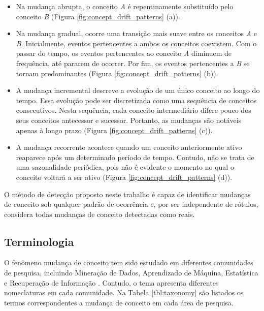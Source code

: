 \documentclass[msc, classic, a4paper]{ufbathesis}
\begin{document}
\begin{itemize}
    \item Na mudança abrupta, o conceito \textit{A} é repentinamente substituído pelo conceito \textit{B} (Figura \ref{fig:concept_drift_patterns} (a)).
    
    \item Na mudança gradual, ocorre uma transição mais suave entre os conceitos \textit{A} e \textit{B}. Inicialmente, eventos pertencentes a ambos os conceitos coexistem. Com o passar do tempo, os eventos pertencentes ao conceito \textit{A} diminuem de frequência, até pararem de ocorrer. Por fim, os eventos pertencentes a \textit{B} se tornam predominantes (Figura \ref{fig:concept_drift_patterns} (b)).
    
    \item A mudança incremental descreve a evolução de um único conceito ao longo do tempo. Essa evolução pode ser discretizada como uma sequência de conceitos consecutivos. Nesta sequência, cada conceito intermediário difere pouco dos seus conceitos antecessor e sucessor. Portanto, as mudanças são notáveis apenas à longo prazo (Figura \ref{fig:concept_drift_patterns} (c)).
    
    \item A mudança recorrente acontece quando um conceito anteriormente ativo reaparece após um determinado período de tempo. Contudo, não se trata de uma sazonalidade periódica, pois não é evidente o momento no qual o conceito voltará a ser ativo (Figura \ref{fig:concept_drift_patterns} (d)).
\end{itemize}

O método de detecção proposto neste trabalho é capaz de identificar mudanças de conceito sob qualquer padrão de ocorrência e, por ser independente de rótulos, considera todas mudanças de conceito detectadas como reais.


\subsection{Terminologia}

O fenômeno mudança de conceito tem sido estudado em diferentes comunidades de pesquisa, incluindo Mineração de Dados,
Aprendizado de Máquina, Estatística e Recuperação de Informação \cite{Zliobaite:2010}.
Contudo, o tema apresenta diferentes nomeclaturas em cada comunidade.
Na Tabela \ref{tbl:taxonomy} são listados os termos correspondentes a mudança de conceito em cada área de pesquisa.
\end{document}
